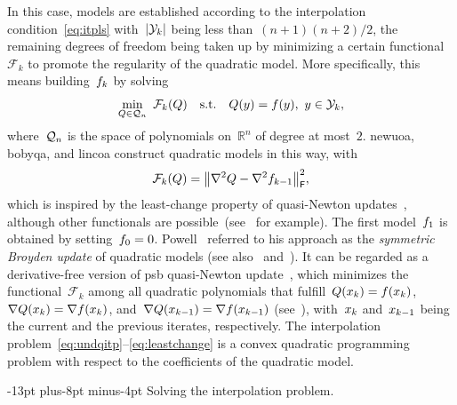 \documentclass[
    smallextended,  %
    final,          %
]{svjour3}
\makeatletter
\newcommand{\abs}[2][]{#1\lvert#2#1\rvert}
\newcommand{\norm}[2][]{#1\lVert#2#1\rVert}
\newcommand{\R}{\mathbb{R}}
\newcommand{\st}{\text{s.t.}}
\newcommand{\frob}{\mathsf{F}}
\newcommand{\func}{\mathcal{F}}
\newcommand{\iter}[1][k]{x\ifthenelse{\equal{#1}{}}{}{_{#1}}}
\newcommand{\objm}[1][k]{\obj\ifthenelse{\equal{#1}{}}{}{_{#1}}}
\newcommand{\obj}{f}
\newcommand{\qspace}[1][n]{\mathcal{Q}\ifthenelse{\equal{#1}{}}{}{_{#1}}}
\newcommand{\xpt}[1][k]{\mathcal{Y}\ifthenelse{\equal{#1}{}}{}{_{#1}}}
\def\paragraph{\@startsection{paragraph}{4}{\z@}%
    {-13pt plus-8pt minus-4pt}{\z@}
    {\sffamily\normalsize\bfseries}}
\makeatother
\begin{document}
In this case, models are established according to the interpolation condition~\eqref{eq:itpls} with~$\abs{\xpt}$ being less than~$(n + 1)(n + 2) / 2$, the remaining degrees of freedom being taken up by minimizing a certain functional~$\func_k$ to promote the regularity of the quadratic model.
More specifically, this means building~$\objm$ by solving
\begin{equation}
    \label{eq:undqitp}
        \min_{Q \in \qspace} ~ \func_k(Q) \quad \st \quad Q(y) = \obj(y), ~ y \in \xpt,
\end{equation}
where~$\qspace$ is the space of polynomials on~$\R^n$ of degree at most~$2$.
\Gls{newuoa}, \gls{bobyqa}, and \gls{lincoa} construct quadratic models in this way, with
\begin{equation}
    \label{eq:leastchange}
    \func_k(Q) = \norm[\big]{\nabla^2 Q - \nabla^2 \objm[k - 1]}_{\frob}^2,
\end{equation}
which is inspired by the least-change property of quasi-Newton updates~\cite{Dennis_Schnabel_1979}, although other functionals are possible~(see~\cite{Conn_Toint_1996,Bandeira_Scheinberg_Vicente_2012,Powell_2013,Zhang_2014,Xie_Yuan_2023} for example).
The first model~$\objm[1]$ is obtained by setting~$\objm[0] = 0$.
Powell~\cite{Powell_2013} referred to his approach as the \emph{symmetric Broyden update} of quadratic models (see also~\cite[\S~3.6]{Zhang_2012} and~\cite[\S~2.4.2]{Ragonneau_2022}).
It can be regarded as a derivative-free version of \gls{psb} quasi-Newton update~\cite{Powell_1970b}, which minimizes the functional~$\func_k$ among all quadratic polynomials that fulfill~$Q(\iter) = \obj(\iter)$, $\nabla Q(\iter) = \nabla \obj(\iter)$, and~$\nabla Q(\iter[k - 1]) = \nabla \obj(\iter[k - 1])$ (see~\cite[Theorem~4.2]{Dennis_Schnabel_1979}), with~$\iter$ and~$\iter[k - 1]$ being the current and the previous iterates, respectively.
The interpolation problem~\eqref{eq:undqitp}--\eqref{eq:leastchange} is a convex quadratic programming problem with respect to the coefficients of the quadratic model.

\paragraph{Solving the interpolation problem.}
\end{document}
